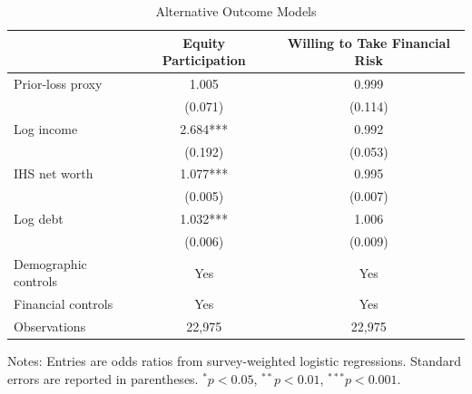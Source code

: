 
\begin{table}[H]
\centering
\caption{Alternative Outcome Models}
\label{tab:alt_results}
\small
\begin{tabular}{lcc}
\toprule
 & Equity Participation & Willing to Take Financial Risk \\
\midrule
Prior-loss proxy & 1.005 & 0.999 \\
 & (0.071) & (0.114) \\
Log income & 2.684*** & 0.992 \\
 & (0.192) & (0.053) \\
IHS net worth & 1.077*** & 0.995 \\
 & (0.005) & (0.007) \\
Log debt & 1.032*** & 1.006 \\
 & (0.006) & (0.009) \\
Demographic controls & Yes & Yes \\
Financial controls & Yes & Yes \\
Observations & 22,975 & 22,975 \\
\bottomrule
\end{tabular}
\begin{flushleft}
\footnotesize Notes: Entries are odds ratios from survey-weighted logistic regressions. Standard errors are reported in parentheses. $^{*}p<0.05$, $^{**}p<0.01$, $^{***}p<0.001$.
\end{flushleft}
\end{table}

